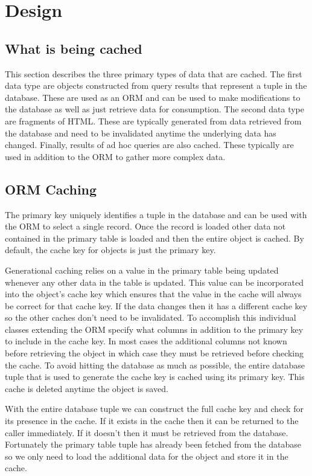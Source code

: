 \documentclass[12pt]{ucthesis}
\begin{document}
\section{Design}
\subsection{What is being cached}
This section describes the three primary types of data that are cached.
The first data type are objects constructed from query results that represent a tuple in the database.
These are used as an ORM and can be used to make modifications to the database as well as just retrieve data for consumption.
The second data type are fragments of HTML.
These are typically generated from data retrieved from the database and need to be invalidated anytime the underlying data has changed.
Finally, results of ad hoc queries are also cached.
These typically are used in addition to the ORM to gather more complex data.

\subsection{ORM Caching}
The primary key uniquely identifies a tuple in the database and can be used with the ORM to select a single record.
Once the record is loaded other data not contained in the primary table is loaded and then the entire object is cached.
By default, the cache key for objects is just the primary key.

Generational caching relies on a value in the primary table being updated whenever any other data in the table is updated.
This value can be incorporated into the object's cache key which ensures that the value in the cache will always be correct for that cache key.
If the data changes then it has a different cache key so the other caches don't need to be invalidated.
To accomplish this individual classes extending the ORM specify what columns in addition to the primary key to include in the cache key.
In most cases the additional columns not known before retrieving the object in which case they must be retrieved before checking the cache.
To avoid hitting the database as much as possible, the entire database tuple that is used to generate the cache key is cached using its primary key.
This cache is deleted anytime the object is saved.

With the entire database tuple we can construct the full cache key and check for its presence in the cache.
If it exists in the cache then it can be returned to the caller immediately.
If it doesn't then it must be retrieved from the database.
Fortunately the primary table tuple has already been fetched from the database so we only need to load the additional data for the object and store it in the cache.
\end{document}
